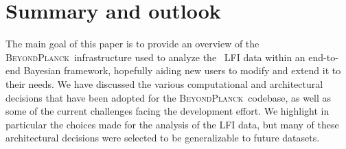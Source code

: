 \documentclass[twocolumn]{aa}
\newcommand{\BP}{\textsc{BeyondPlanck}}
\begin{document}









\section{Summary and outlook}
\label{sec:conclusions}

The main goal of this paper is to provide an overview of the
\BP\ infrastructure used to analyze the \Planck\ LFI data within an
end-to-end Bayesian framework, hopefully aiding new users to modify
and extend it to their needs. We have discussed the various
computational and architectural decisions that have been adopted for
the \BP\ codebase, as well as some of the current challenges facing
the development effort. We highlight in particular the choices made
for the analysis of the LFI data, but many of these architectural
decisions were selected to be generalizable to future datasets.
\end{document}
